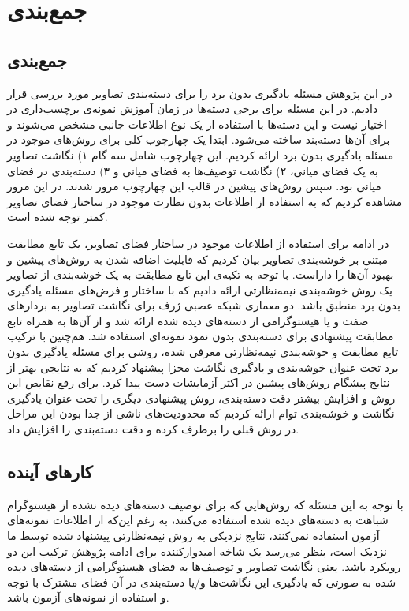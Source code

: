 \chapter{جمع‌بندی} \label{chap:conclusion}
\section{جمع‌بندی}
در این پژوهش مسئله یادگیری بدون برد را برای دسته‌بندی تصاویر مورد بررسی قرار دادیم. در این مسئله برای برخی دسته‌ها در زمان آموزش نمونه‌ی برچسب‌داری در اختیار نیست و این دسته‌ها با استفاده از یک نوع اطلاعات جانبی مشخص می‌شوند و برای آن‌ها دسته‌بند ساخته می‌شود. ابتدا یک چهارچوب کلی برای روش‌های موجود در مسئله یادگیری بدون برد ارائه کردیم. این چهارچوب شامل سه گام ۱) نگاشت تصاویر به یک فضای میانی، ۲) نگاشت توصیف‌ها به فضای میانی و ۳) دسته‌بندی در فضای میانی بود. سپس روش‌های پیشین در قالب این چهارچوب مرور شدند. در این مرور مشاهده کردیم که به استفاده از اطلاعات بدون نظارت موجود در ساختار فضای تصاویر کمتر توجه شده است. 

در ادامه برای استفاده از اطلاعات موجود در ساختار فضای تصاویر، یک تابع مطابقت مبتنی بر خوشه‌بندی تصاویر بیان کردیم که قابلیت اضافه شدن به روش‌های پیشین و بهبود آن‌ها را داراست. با توجه به تکیه‌ی این تابع مطابقت به یک خوشه‌بندی از تصاویر یک روش خوشه‌بندی نیمه‌نظارتی ارائه دادیم که با ساختار و فرض‌های مسئله یادگیری بدون برد منطبق باشد. دو معماری شبکه عصبی ژرف برای نگاشت تصاویر به بردارهای صفت و یا هیستوگرامی از دسته‌های دیده شده ارائه شد و از آن‌ها به همراه تابع مطابقت پیشنهادی برای دسته‌بندی بدون نمود نمونه‌ای استفاده شد. هم‌چنین با ترکیب تابع مطابقت و خوشه‌بندی نیمه‌نظارتی معرفی شده،  روشی برای مسئله یادگیری بدون برد تحت عنوان خوشه‌بندی و یادگیری نگاشت مجزا پیشنهاد کردیم که به نتایجی بهتر از نتایج پیشگام روش‌های پیشین در اکثر آزمایشات دست پیدا کرد. برای رفع نقایص این روش و  افزایش بیشتر دقت دسته‌بندی، روش پیشنهادی دیگری را تحت عنوان یادگیری نگاشت و خوشه‌بندی توام ارائه کردیم که محدودیت‌های ناشی از جدا بودن این مراحل در روش قبلی را برطرف کرده و دقت دسته‌بندی را افزایش داد. 
\section{کار‌های آینده}
با توجه به این مسئله که روش‌هایی که برای توصیف دسته‌های دیده نشده از هیستوگرام شباهت به دسته‌های دیده شده استفاده می‌کنند، به رغم این‌که از اطلاعات نمونه‌های آزمون استفاده نمی‌کنند، نتایج نزدیکی به روش نیمه‌نظارتی پیشنهاد شده توسط ما نزدیک است، بنظر می‌رسد یک شاخه امیدوارکننده برای ادامه پژوهش ترکیب این دو رویکرد باشد. یعنی نگاشت تصاویر و توصیف‌ها به فضای هیستوگرامی از دسته‌های دیده شده به صورتی که یادگیری این نگاشت‌ها و/یا دسته‌بندی در آن فضای مشترک با توجه و استفاده از نمونه‌های آزمون باشد.

